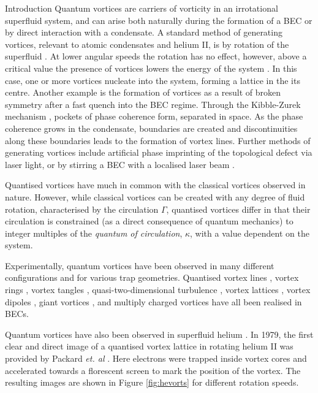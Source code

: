 \begin{chapter}{\label{cha:bose_gases}Introduction}
Quantum vortices are carriers of vorticity in an irrotational superfluid system, and can arise both naturally during the formation of a BEC or by direct interaction with a condensate. A standard method of generating vortices, relevant to atomic condensates and helium II, is by rotation of the superfluid \cite{PhysRevLett.43.214,PhysRevLett.84.806,hodby_2002,Abo-Shaeer476, PhysRevLett.87.210403}. At lower angular speeds the rotation has no effect, however, above a critical value the presence of vortices lowers the energy of the system \cite{0953-8984-13-12-201,NozieresPines}. In this case, one or more vortices nucleate into the system, forming a lattice \cite{PhysRevLett.43.214,Abo-Shaeer476} in the its centre. Another example is the formation of vortices as a result of broken symmetry after a fast quench into the BEC regime. Through the Kibble-Zurek mechanism \cite{0305-4470-9-8-029,Zurek85,KZvort99}, pockets of phase coherence form, separated in space. As the phase coherence grows in the condensate, boundaries are created and discontinuities along these boundaries leads to the formation of vortex lines. Further methods of generating vortices include artificial phase imprinting \cite{Cornell99,Dobrek99,Leanhardt99} of the topological defect via laser light, or by stirring a BEC with a localised laser beam \cite{PhysRevLett.84.806,hodby_2002,Abo-Shaeer476,jma00,Raman01,Inouye}.

Quantised vortices have much in common with the classical vortices observed in nature. However, while classical vortices can be created with any degree of fluid rotation, characterised by the circulation $\Gamma$, quantised vortices differ in that their circulation is constrained (as a direct consequence of quantum mechanics) to integer multiples of the {\it quantum of circulation}, $\kappa$, with a value dependent on the system.

Experimentally, quantum vortices have been observed in many different configurations and for various trap geometries. Quantised vortex lines \cite{Dutton27072001}, vortex rings \cite{PhysRevLett.86.2926}, vortex tangles \cite{Henn}, quasi-two-dimensional turbulence \cite{kwon_moon_14}, vortex lattices \cite{PhysRevLett.84.806,Abo-Shaeer476,abo_shaeer_2002,PhysRevLett.86.4443}, vortex dipoles \cite{Neely}, giant vortices \cite{PhysRevLett.90.170405}, and multiply charged vortices \cite{PhysRevLett.93.160406} have all been realised in BECs.

Quantum vortices have also been observed in superfluid helium \cite{Vinen218}. In 1979, the first clear and direct image of a quantised vortex lattice in rotating helium II was provided by Packard {\it et. al} \cite{PhysRevLett.43.214}. Here electrons were trapped inside vortex cores and accelerated towards a florescent screen to mark the position of the vortex. The resulting images are shown in Figure \ref{fig:hevorts} for different rotation speeds.


\end{chapter}
